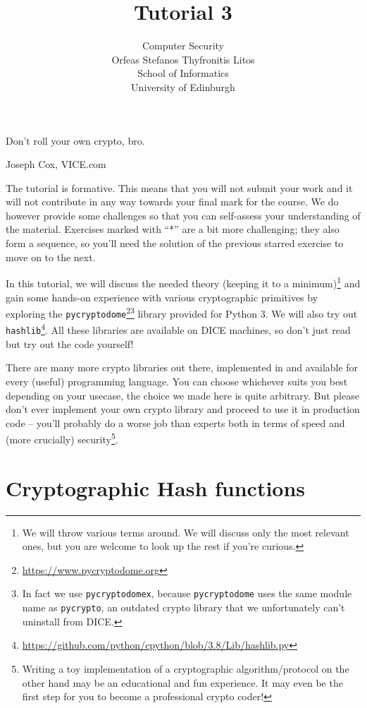 \documentclass[a4paper,11pt]{article}
\title{Tutorial 3}
\author{Computer Security \\
Orfeas Stefanos Thyfronitis Litos \\
School of Informatics \\
University of Edinburgh}
\date{}
\begin{document}
  \maketitle

  \epigraph{Don't roll your own crypto, bro.}{Joseph Cox, VICE.com}

  The tutorial is formative. This means that you will not submit your work and
  it will not contribute in any way towards your final mark for the course. We
  do however provide some challenges so that you can self-assess your
  understanding of the material. Exercises marked with ``*'' are a bit more
  challenging; they also form a sequence, so you'll need the solution of the
  previous starred exercise to move on to the next.

  In this tutorial, we will discuss the needed theory (keeping it to a
  minimum)\footnote{We will throw various terms around. We will discuss only the
  most relevant ones, but you are welcome to look up the rest if you're
  curious.} and gain some hands-on experience with various cryptographic
  primitives by exploring the
  \texttt{pycryptodome}\footnote{\url{https://www.pycryptodome.org}}\footnote{In
  fact we use \texttt{pycryptodomex}, because \texttt{pycryptodome} uses the
  same module name as \texttt{pycrypto}, an outdated crypto library that we
  unfortunately can't uninstall from DICE.} library provided for Python 3. We
  will also try out
  \texttt{hashlib}\footnote{\url{https://github.com/python/cpython/blob/3.8/Lib/hashlib.py}}.
  All these libraries are available on DICE machines, so don't just read but try
  out the code yourself!

  There are many more crypto libraries out there, implemented in and available
  for every (useful) programming language. You can choose whichever suits you
  best depending on your usecase, the choice we made here is quite arbitrary.
  But please don't ever implement your own crypto library and proceed to use it
  in production code -- you'll probably do a worse job than experts both in
  terms of speed and (more crucially) security\footnote{Writing a toy
  implementation of a cryptographic algorithm/protocol on the other hand may be
  an educational and fun experience. It may even be the first step for you to
  become a professional crypto coder!}.

  \section{Cryptographic Hash functions}
\end{document}
